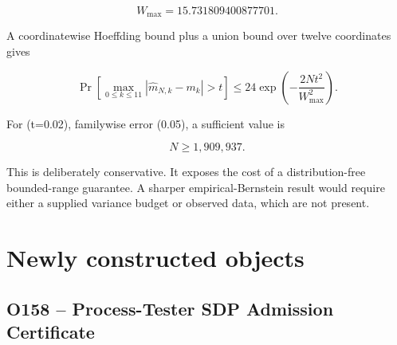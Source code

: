 \documentclass[11pt,a4paper,openany]{report}
\begin{document}
\[
W_{\max}=15.731809400877701.
\]

A coordinatewise Hoeffding bound plus a union bound over twelve coordinates gives

\[
\Pr\left[
\max_{0\le k\le11}|\widehat m_{N,k}-m_k|>t
\right]
\le24\exp\left(-\frac{2Nt^2}{W_{\max}^2}\right).
\]

For (t=0.02), familywise error (0.05), a sufficient value is

\[
N\ge1,909,937.
\]

This is deliberately conservative. It exposes the cost of a distribution-free bounded-range guarantee. A sharper empirical-Bernstein result would require either a supplied variance budget or observed data, which are not present.

\chapter{Newly constructed objects}

\section{O158 -- Process-Tester SDP Admission Certificate}
\end{document}
